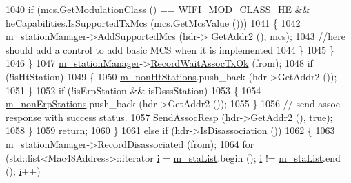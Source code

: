 \begin{DoxyCode}
1040                           \textcolor{keywordflow}{if} (mcs.GetModulationClass () == \hyperlink{namespacens3_aa999e1221606a2b21b1eb33c2007c217abfa4f7272510045a9b43e8ac27ac13b0}{WIFI\_MOD\_CLASS\_HE} && 
      heCapabilities.IsSupportedTxMcs (mcs.GetMcsValue ()))
1041                             \{
1042                               \hyperlink{classns3_1_1RegularWifiMac_a76d1a5e27b64bfe36f24a55d1eea2775}{m\_stationManager}->\hyperlink{classns3_1_1WifiRemoteStationManager_a4fd51c027afacdfa7225346d6d88c6b3}{AddSupportedMcs} (hdr->
      GetAddr2 (), mcs);
1043                               \textcolor{comment}{//here should add a control to add basic MCS when it is implemented}
1044                             \}
1045                         \}
1046                     \}
1047                   \hyperlink{classns3_1_1RegularWifiMac_a76d1a5e27b64bfe36f24a55d1eea2775}{m\_stationManager}->\hyperlink{classns3_1_1WifiRemoteStationManager_a884385355dee42ba3eed2757bc485ac8}{RecordWaitAssocTxOk} (from);
1048                   \textcolor{keywordflow}{if} (!isHtStation)
1049                     \{
1050                       \hyperlink{classns3_1_1ApWifiMac_a148d1aa2c429b0530603c797775fa5da}{m\_nonHtStations}.push\_back (hdr->GetAddr2 ());
1051                     \}
1052                   \textcolor{keywordflow}{if} (!isErpStation && isDsssStation)
1053                     \{
1054                       \hyperlink{classns3_1_1ApWifiMac_a0f928a5ab62fc090a939a26ac3675caf}{m\_nonErpStations}.push\_back (hdr->GetAddr2 ());
1055                     \}
1056                   \textcolor{comment}{// send assoc response with success status.}
1057                   \hyperlink{classns3_1_1ApWifiMac_a0a36426da94f43b0a9136adf4e58f425}{SendAssocResp} (hdr->GetAddr2 (), \textcolor{keyword}{true});
1058                 \}
1059               \textcolor{keywordflow}{return};
1060             \}
1061           \textcolor{keywordflow}{else} \textcolor{keywordflow}{if} (hdr->IsDisassociation ())
1062             \{
1063               \hyperlink{classns3_1_1RegularWifiMac_a76d1a5e27b64bfe36f24a55d1eea2775}{m\_stationManager}->\hyperlink{classns3_1_1WifiRemoteStationManager_abcb92c63342aed2603c1dfb131e0fe8a}{RecordDisassociated} (from);
1064               \textcolor{keywordflow}{for} (std::list<Mac48Address>::iterator \hyperlink{bernuolliDistribution_8m_a6f6ccfcf58b31cb6412107d9d5281426}{i} = \hyperlink{classns3_1_1ApWifiMac_a2a483f2002457f12a9e53e4b227cf1e8}{m\_staList}.begin (); 
      \hyperlink{bernuolliDistribution_8m_a6f6ccfcf58b31cb6412107d9d5281426}{i} != \hyperlink{classns3_1_1ApWifiMac_a2a483f2002457f12a9e53e4b227cf1e8}{m\_staList}.end (); \hyperlink{bernuolliDistribution_8m_a6f6ccfcf58b31cb6412107d9d5281426}{i}++)

\end{DoxyCode}

